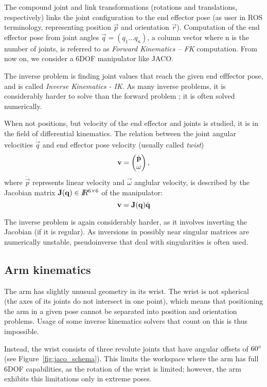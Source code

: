 \documentclass[buriama8_dp.tex]{subfiles}
\begin{document}
The compound joint and link transformations (rotations and translations, respectively) links the joint configuration to the end effector pose (as user in ROS terminology, representing position \(\vec p\) and orientation \(\vec r\)). Computation of the end effector pose from joint angles \(\vec q = (q_1 \ldots q_n)\), a column vector where \m n is the number of joints, is referred to as \emph{Forward Kinematics -- FK} computation. From now on, we consider a 6DOF manipulator like JACO.

The inverse problem is finding joint values that reach the given end efffector pose, and is called \emph{Inverse Kinematics - IK}. As many inverse problems, it is considerably harder to solve than the forward problem \cite[sec. 2.12]{manipulators}; it is often solved numerically.

When not positions, but velocity of the end effector and joints is studied, it is in the field of differential kinematics. The relation between the joint angular velocities \(\dot{\vec q}\) and end effector pose velocity (usually called \emph{twist})
\[\vec v = \colvec{\dot{\vec p}}{\vec \omega},\]
where \(\dot{\vec p}\) represents linear velocity and \(\vec \omega\) anglular velocity, is described by the Jacobian matrix \(\mathbf{J}(\mathbf{q}) \in I\!\!R^{6 \times 6}\) of the manipulator:
\[
  \mathbf{v} = \mathbf{J}(\mathbf{q})\dot{\mathbf{q}}
\]

The inverse problem is again considerably harder, as it involves inverting the Jacobian (if it is regular). As inversions in possibly near singular matrices are numerically unstable, pseudoinverse that deal with singularities is often used.

\subsection{Arm kinematics}
\label{subsec:arm_kinematics}

The arm has slightly unusual geometry in its wrist. The wrist is not spherical (the axes of its joints do not intersect in one point), which means that positioning the arm in a given pose cannot be separated into position and orientation problems. Usage of some inverse kinematics solvers that count on this is thus impossible.

Instead, the wrist consists of three revolute joints that have angular offsets of \(60^\circ\) (see Figure~\ref{fig:jaco_schema}). This limits the workspace where the arm has full 6DOF capabilities, as the rotation of the wrist is limited; however, the arm exhibits this limitations only in extreme poses.
\end{document}
